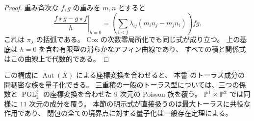 \begin{proof}
重み斉次な $f,g$ の重みを $m,n$ とすると
\[
 \left.\frac{f\star g-g\star f}{h}\right|_{h=0}
 =\left(\sum_{i<j}\lambda_{ij}(m_i n_j-m_j n_i)\right)fg.
\]
これは $\pi_\lambda$ の括弧である。
Cox の次数零局所化でも同じ式が成り立つ。
上の基底は $h=0$ を含む有限型の滑らかなアフィン曲線であり、
すべての積と関係式はこの曲線上で代数的である。
\end{proof}

この構成に $\operatorname{Aut}(X)$ による座標変換を合わせると、
本書 のトーラス成分の開稠密な族を量子化できる。
三重積の一般のトーラス型については、三つの係数と
$\operatorname{PGL}_2^3$ の座標変換を合わせた $9$ 次元の Poisson 族を覆う。
$\mathbb P^1\times\mathbb P^2$ では同様に $11$ 次元の成分を覆う。
本節の明示式が直接扱うのは最大トーラスに共役な作用であり、
閉包の全ての境界点に対する量子化は一般存在定理による。
